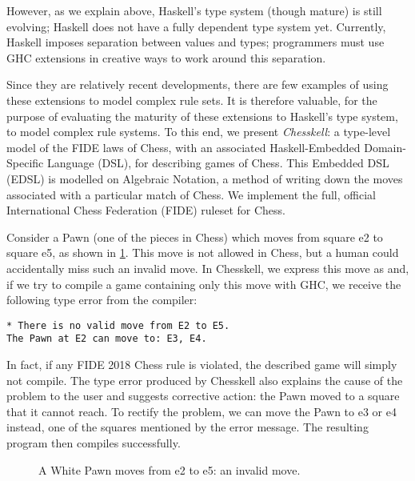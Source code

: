 However, as we explain above, Haskell's type system (though mature) is still evolving; Haskell does not have a fully dependent type system yet. Currently, Haskell imposes separation between values and types; programmers must use GHC extensions in creative ways to work around this separation.

Since they are relatively recent developments, there are few examples of using these extensions to model complex rule sets. It is therefore valuable, for the purpose of evaluating the maturity of these extensions to Haskell's type system, to model complex rule systems. To this end, we present \emph{Chesskell}: a type-level model of the FIDE laws of Chess, with an associated Haskell-Embedded Domain-Specific Language (DSL), for describing games of Chess. This Embedded DSL (EDSL) is modelled on Algebraic Notation, a method of writing down the moves associated with a particular match of Chess. We implement the full, official International Chess Federation (FIDE) ruleset for Chess.

Consider a Pawn (one of the pieces in Chess) which moves from square e2 to square e5, as shown in \cref{badpawnmove}. This move is not allowed in Chess, but a human could accidentally miss such an invalid move. In Chesskell, we express this move as  and, if we try to compile a game containing only this move with GHC, we receive the following type error from the compiler:

\begin{verbatim}
* There is no valid move from E2 to E5.
The Pawn at E2 can move to: E3, E4.
\end{verbatim}

In fact, if any FIDE 2018 Chess rule is violated, the described game will simply not compile. The type error produced by Chesskell also explains the cause of the problem to the user and suggests corrective action: the Pawn moved to a square that it cannot reach. To rectify the problem, we can move the Pawn to e3 or e4 instead, one of the squares mentioned by the error message. The resulting program then compiles successfully.

\begin{figure}[h]
    \centering
    \vspace*{1cm}
    \showboard
    \quad
    \showboard
    \caption{A White Pawn moves from e2 to e5: an invalid move.}
    \label{badpawnmove}
\end{figure}

